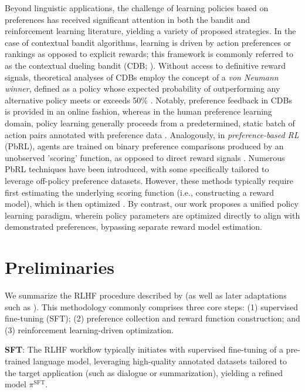 Beyond linguistic applications, the challenge of learning policies based on preferences has received significant attention in both the bandit and reinforcement learning literature, yielding a variety of proposed strategies. In the case of contextual bandit algorithms, learning is driven by action preferences or rankings as opposed to explicit rewards; this framework is commonly referred to as the contextual dueling bandit (CDB; \cite{yue2012karmed,dudik2015contextual}). Without access to definitive reward signals, theoretical analyses of CDBs employ the concept of a \textit{von Neumann winner}, defined as a policy whose expected probability of outperforming any alternative policy meets or exceeds 50\% \citep{dudik2015contextual}. Notably, preference feedback in CDBs is provided in an online fashion, whereas in the human preference learning domain, policy learning generally proceeds from a predetermined, static batch of action pairs annotated with preference data \citep{yan2022human}. Analogously, in \textit{preference-based RL} (PbRL), agents are trained on binary preference comparisons produced by an unobserved 'scoring' function, as opposed to direct reward signals \citep{BusaFekete2014,ruiz2023dueling}. Numerous PbRL techniques have been introduced, with some specifically tailored to leverage off-policy preference datasets. However, these methods typically require first estimating the underlying scoring function (i.e., constructing a reward model), which is then optimized \citep{jain2013learning,BusaFekete2014,christiano2017deep,sadigh2017active,kupcsik2018learning}. By contrast, our work proposes a unified policy learning paradigm, wherein policy parameters are optimized directly to align with demonstrated preferences, bypassing separate reward model estimation.

\section{Preliminaries}\label{section:prelims}

We summarize the RLHF procedure described by \citeauthor{ziegler2020finetuning} (as well as later adaptations such as \citep{stiennon2022learning, bai2022training, ouyang2022training}). This methodology commonly comprises three core steps: (1) supervised fine-tuning (SFT); (2) preference collection and reward function construction; and (3) reinforcement learning-driven optimization.

\textbf{SFT}: The RLHF workflow typically initiates with supervised fine-tuning of a pre-trained language model, leveraging high-quality annotated datasets tailored to the target application (such as dialogue or summarization), yielding a refined model $\pi^\text{SFT}$.

